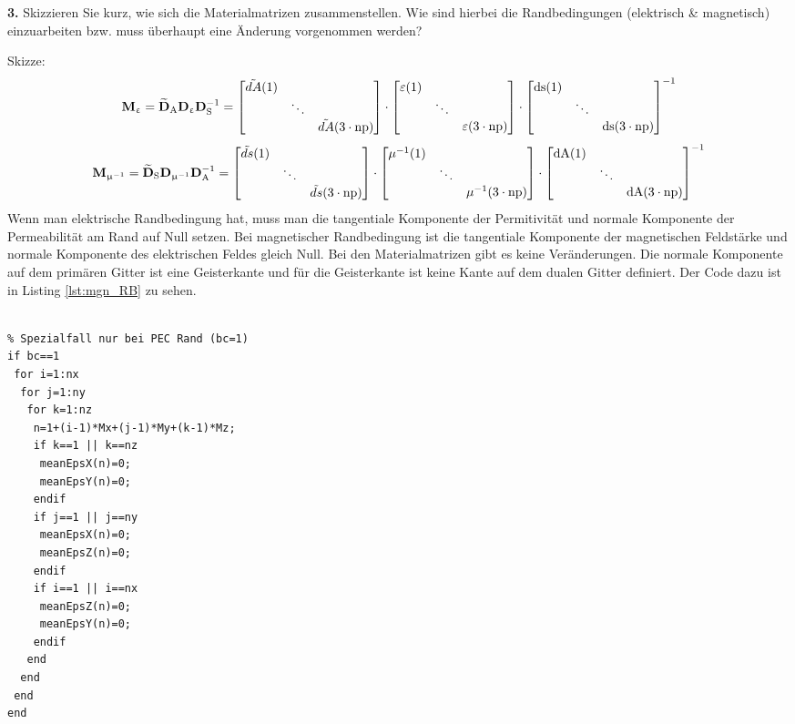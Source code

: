 \documentclass[Protokollheft.tex]{subfiles}
\begin{document}
\begin{framed}
	\noindent \textbf{3.} Skizzieren Sie kurz, wie sich die Materialmatrizen zusammenstellen. Wie sind hierbei die Randbedingungen (elektrisch \& magnetisch) einzuarbeiten bzw. muss überhaupt eine Änderung vorgenommen werden?\label{exer:materialMats}
\end{framed}
\noindent
Skizze:\\
$$\mathbf{M}_{\upvarepsilon} =\mathbf{\widetilde{D}}_\text{A}\mathbf{D}_{\upvarepsilon}\mathbf{D}_\text{S}^{-1} = \begin{bmatrix}
\tilde{dA}(1) & & \\
& \ddots & \\
& & \tilde{dA}(3\cdot\mathrm{np})
\end{bmatrix}
\cdot
 \begin{bmatrix}
\varepsilon(1) & & \\
& \ddots & \\
& & \varepsilon(3\cdot\mathrm{np})
\end{bmatrix}
\cdot
\begin{bmatrix}
\mathrm{ds}(1) & & \\
& \ddots & \\
& & \mathrm{ds}(3\cdot\mathrm{np})
\end{bmatrix}^{-1}$$
$$\mathbf{M}_{\upmu^{-1}}=\mathbf{\widetilde{D}}_\text{S}\mathbf{D}_{\upmu^{-1}}\mathbf{D}_\text{A}^{-1}=
\begin{bmatrix}
\tilde{ds}(1) & & \\
& \ddots & \\
& & \tilde{ds}(3\cdot\mathrm{np})
\end{bmatrix}
\cdot
 \begin{bmatrix}
\mu^{-1}(1) & & \\
& \ddots & \\
& & \mu^{-1}(3\cdot\mathrm{np})
\end{bmatrix}
\cdot
\begin{bmatrix}
\mathrm{dA}(1) & & \\
& \ddots & \\
& & \mathrm{dA}(3\cdot\mathrm{np})
\end{bmatrix}^{-1}$$
\noindent
Wenn man elektrische Randbedingung hat, muss man die tangentiale Komponente der Permitivität und normale Komponente der Permeabilität am Rand auf Null setzen. Bei magnetischer Randbedingung ist die tangentiale Komponente der magnetischen Feldstärke und normale Komponente des elektrischen Feldes gleich Null. Bei den Materialmatrizen gibt es keine Veränderungen. Die normale Komponente auf dem primären Gitter ist eine Geisterkante und für die Geisterkante ist keine Kante auf dem dualen Gitter definiert. Der Code dazu ist in Listing \ref{lst:mgn_RB} zu sehen.
\begin{lstlisting}[caption={Einsetzten der elektrischen Randbedigungen},label={lst:mgn_RB}]
%% Randbedingungen

% Spezialfall nur bei PEC Rand (bc=1)
if bc==1
 for i=1:nx
  for j=1:ny
   for k=1:nz
    n=1+(i-1)*Mx+(j-1)*My+(k-1)*Mz;
    if k==1 || k==nz
     meanEpsX(n)=0; 
     meanEpsY(n)=0;
    endif
    if j==1 || j==ny
     meanEpsX(n)=0; 
     meanEpsZ(n)=0;
    endif
    if i==1 || i==nx
     meanEpsZ(n)=0; 
     meanEpsY(n)=0;
    endif
   end
  end
 end
end
\end{lstlisting}
\end{document}
